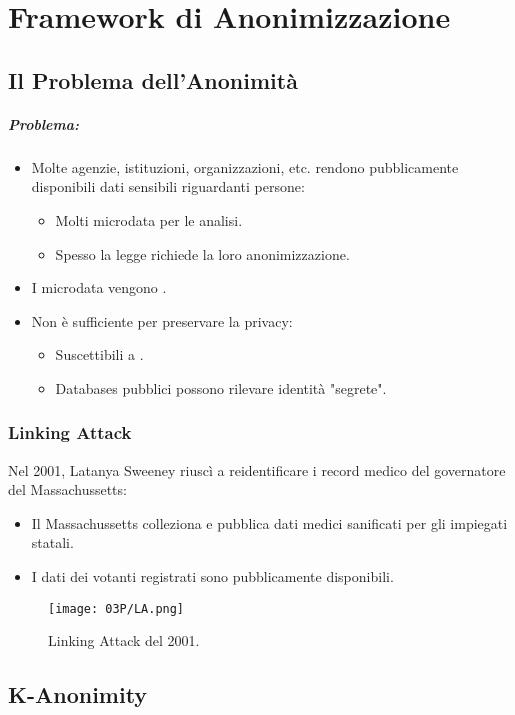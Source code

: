 \chapter{Framework di Anonimizzazione}


\section{Il Problema dell'Anonimità}

\paragraph{Problema:}

\begin{itemize}
  \item Molte agenzie, istituzioni, organizzazioni, etc. rendono pubblicamente disponibili dati sensibili riguardanti persone: 
    \begin{itemize}
      \item Molti microdata per le analisi. 
      \item Spesso la legge richiede la loro anonimizzazione.
    \end{itemize}
  \item I microdata vengono . 
  \item Non è sufficiente per preservare la privacy:
    \begin{itemize}
      \item Suscettibili a . 
      \item Databases pubblici possono rilevare identità "segrete".
    \end{itemize}
\end{itemize}

\subsection{Linking Attack}

Nel 2001, Latanya Sweeney riuscì a reidentificare i record medico del governatore del Massachussetts: 
\begin{itemize}
  \item Il Massachussetts colleziona e pubblica dati medici sanificati per gli impiegati statali. 
  \item I dati dei votanti registrati sono pubblicamente disponibili.
\end{itemize}

\begin{figure}[h]
    \centering
    \texttt{[image: 03P/LA.png]}
    \caption{Linking Attack del 2001.}
\end{figure}



\section{K-Anonimity}
